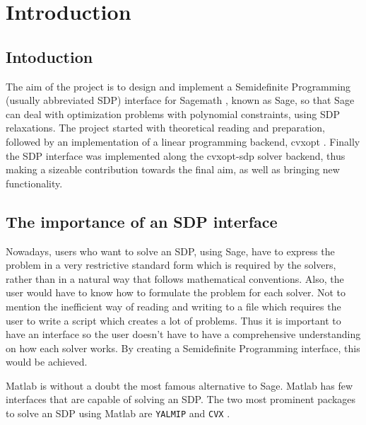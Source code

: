 
\chapter{Introduction} %

\label{Chapter1} %



\section{Intoduction}
The aim of the project is to design and implement a Semidefinite Programming (usually abbreviated SDP)  interface for Sagemath \cite{sagepress}, known as Sage, so that Sage can deal with optimization problems with polynomial constraints, using SDP relaxations. The project started with theoretical reading and preparation, followed by an implementation of a linear programming backend, cvxopt \cite{cvxopthome}. Finally the SDP interface was implemented along the cvxopt-sdp solver backend, thus making a sizeable contribution towards the final aim, as well as bringing new functionality. 



\section{The importance of an SDP interface}
Nowadays, users who want to solve an SDP, using Sage, have to express the problem in a very restrictive standard form which is required by the solvers, rather than in a natural way that follows mathematical conventions.  
 Also, the user would have to know how to formulate the problem for each solver. Not to mention the inefficient way of reading and writing to a file which requires the user to write a script which creates a lot of problems.
 Thus it is important to have an interface so the user doesn't have to have a comprehensive understanding on how each solver works. By creating a Semidefinite Programming interface, this would be achieved. 
	
	Matlab \cite{matlab} is without a doubt the most famous alternative to Sage. Matlab has few interfaces that are capable of solving an SDP.  The two most prominent packages to solve an SDP using Matlab are \texttt{YALMIP} \cite{yalmip} and \texttt{CVX} \cite{cvx}.


